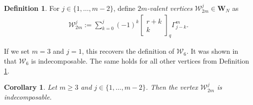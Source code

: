 \documentclass[12pt]{amsart}
\newtheorem{corollary}[theorem]{Corollary}
\theoremstyle{definition}
\newtheorem{definition}[theorem]{Definition}
\theoremstyle{remark}
\numberwithin{equation}{section}
\numberwithin{figure}{section}
\newcommand{\Web}{\mathbf{W}_N}
\newcommand{\Wsix}{\mathcal{W}_6}
\begin{document}
\begin{definition}\label{def:2m valent vertex}
    For $j\in \{1, \ldots, m-2\}$, define \emph{$2m$-valent vertices}  $ \mathcal{W}^j_{2m} \in \Web$  as
    \begin{align*}
        \mathcal{W}^j_{2m} := \sum_{k = 0}^j (-1)^k\begin{bmatrix}
            r + k \\
            k
        \end{bmatrix}_q\Gamma_{j-k}^m.
    \end{align*}
\end{definition}

If we set $m= 3$ and $j = 1$, this recovers the definition of $\Wsix$. It was shown in \cite[Proposition 3.8]{grlj20266valentvertexmathfrakglnweb} that $\Wsix$ is indecomposable. The same holds for all other vertices from Definition \ref{def:2m valent vertex}.

\begin{corollary}\label{prop:two-m extreme coefficients}
Let $m \geq 3$ and $j\in \{1, \ldots, m-2\}$. Then the vertex $\mathcal{W}^j_{2m}$ is  indecomposable.
\end{corollary}
\end{document}
